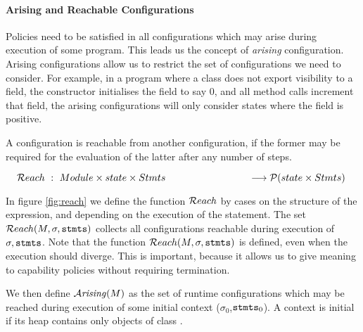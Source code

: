 \paragraph{Arising and Reachable Configurations}  
\label{formal:reachable}

Policies need to be satisfied in all configurations which may arise during execution of some program. This leads us the concept of {\em arising} configuration. Arising configurations allow us to restrict the set of configurations we need to consider. For example, in a program where a class does not export visibility to a field, the constructor initialises the field to say $0$, and all method calls increment that field, the arising configurations will only consider states where the field is positive.

A configuration is reachable from another configuration, if the former may be required for the evaluation of the latter after any number of steps.   

$
{ ~ } {\hspace{.1in}}  {\mathcal{R}each} \ :
\ {Module} \times {state} \times {Stmts}  \\
{ ~ } {\hspace{.1in}}{ ~ } {\hspace{.1in}}{ ~ } {\hspace{.1in}}{ ~ } {\hspace{.1in}} { ~ } {\hspace{.1in}}{ ~ } {\hspace{.1in}}{ ~ } {\hspace{.1in}}{ ~ } {\hspace{.1in}} \longrightarrow \mathcal{P}( {state} \times {Stmts}  )
$


\noindent
In figure \ref{fig:reach} we define the function  ${\mathcal{R}each}$  by cases on the structure of the expression, and depending on the execution of the statement. The set ${\mathcal{R}each}(M, \sigma, {{\textrm{\ttfamily{stmts}}}})$
  collects all configurations reachable during execution of $\sigma, {{\textrm{\ttfamily{stmts}}}}$. Note that the function  ${\mathcal{R}each}(M, \sigma, {{\textrm{\ttfamily{stmts}}}}) $ is defined, even when the execution should diverge. This is important, because it allows us to give meaning to capability policies without requiring termination. 
 
 
 
We  then define ${\mathcal{A}}\textrm{\textit{rising}}(M)$ as the set of runtime configurations
which may be reached during execution of some initial context ($\sigma_0$,${{\textrm{\ttfamily{stmts}}}}_0$).
 A context is initial if its heap contains only objects of class .

